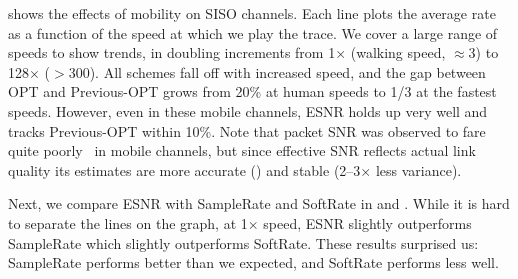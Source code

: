  shows the effects of mobility on SISO channels. Each line plots the average rate as a function of the speed at which we play the trace. We cover a large range of speeds to show trends, in doubling increments from 1$\times$ (walking speed, $\approx$3\mph) to 128$\times$ ($>$300\mph). All schemes fall off with increased speed, and the gap between OPT and Previous-OPT grows from 20\% at human speeds to 1/3 at the fastest speeds. However, even in these mobile channels, ESNR holds up very well and tracks Previous-OPT within 10\%.
Note that packet SNR was observed to fare quite poorly~\cite{Vutukuru_SoftRate} in mobile channels, but since effective SNR reflects actual link quality its estimates are more accurate () and stable (2--3$\times$ less variance).

Next, we compare ESNR with SampleRate and SoftRate %
in  and . While it is hard to separate the lines on the graph, at 1$\times$ speed, ESNR slightly outperforms SampleRate which slightly outperforms SoftRate. These results surprised us: SampleRate performs better than we expected, and SoftRate performs less well. 

